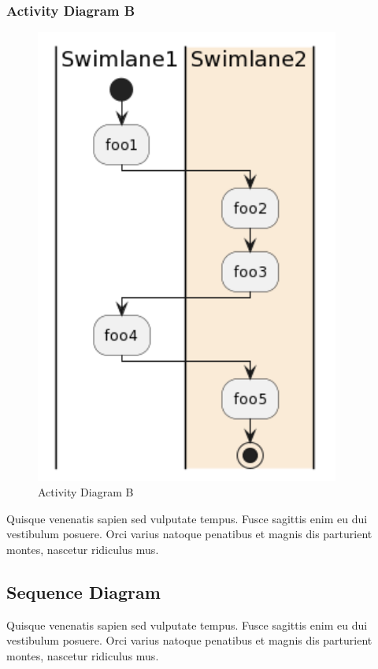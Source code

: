 \subsubsection{Activity Diagram B}
\begin{figure}[H]
    \centering
    \includegraphics[width=10cm]{assets/pics/dummy-activity-diagram.png}
    \caption{Activity Diagram B}
    \label{fig:activityDiagramB}
\end{figure}

Quisque venenatis sapien sed vulputate tempus. Fusce sagittis enim eu dui vestibulum posuere. Orci varius natoque penatibus et magnis dis parturient montes, nascetur ridiculus mus.

\subsection{Sequence Diagram}
Quisque venenatis sapien sed vulputate tempus. Fusce sagittis enim eu dui vestibulum posuere. Orci varius natoque penatibus et magnis dis parturient montes, nascetur ridiculus mus.

